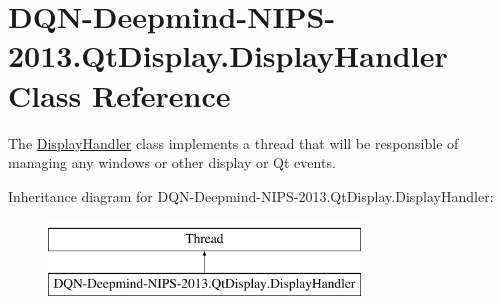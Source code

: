 \hypertarget{classDQN-Deepmind-NIPS-2013_1_1QtDisplay_1_1DisplayHandler}{}\section{D\+Q\+N-\/\+Deepmind-\/\+N\+I\+P\+S-\/2013.Qt\+Display.\+Display\+Handler Class Reference}
\label{classDQN-Deepmind-NIPS-2013_1_1QtDisplay_1_1DisplayHandler}


The \hyperlink{classDQN-Deepmind-NIPS-2013_1_1QtDisplay_1_1DisplayHandler}{Display\+Handler} class implements a thread that will be responsible of managing any windows or other display or Qt events.  


Inheritance diagram for D\+Q\+N-\/\+Deepmind-\/\+N\+I\+P\+S-\/2013.Qt\+Display.\+Display\+Handler\+:\begin{figure}[H]
\begin{center}
\leavevmode
\includegraphics[height=2.000000cm]{classDQN-Deepmind-NIPS-2013_1_1QtDisplay_1_1DisplayHandler}
\end{center}
\end{figure}
